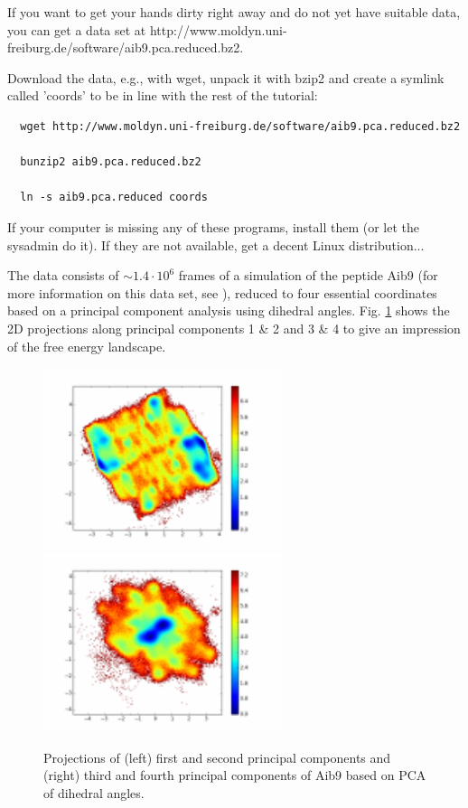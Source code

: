 \documentclass[12pt,a4paper,twoside,english,fleqn]{article}
\begin{document}
\begin{mdframed}[frametitle={Test data available!}]
  If you want to get your hands dirty right away and do not yet have suitable
  data, you can get a data set at
  http://www.moldyn.uni-freiburg.de/software/aib9.pca.reduced.bz2.

  Download the data, e.g., with {\ttfamily wget}, unpack it with
  {\ttfamily bzip2} and create a symlink called 'coords' to be in line with
  the rest of the tutorial:
  \begin{lstlisting}
  wget http://www.moldyn.uni-freiburg.de/software/aib9.pca.reduced.bz2

  bunzip2 aib9.pca.reduced.bz2

  ln -s aib9.pca.reduced coords
  \end{lstlisting}

  If your computer is missing any of these programs, install them (or let the
  sysadmin do it). If they are not available, get a decent Linux distribution...

  The data consists of $\sim 1.4 \cdot 10^6$ frames of a simulation of the
  peptide Aib9 (for more information on this data set, see \cite{Buchenberg15}),
  reduced to four essential coordinates based on a principal
  component analysis using dihedral angles.
  Fig. \ref{fig:pca_proj} shows the 2D projections along principal components
  1 \& 2 and 3 \& 4 to give an impression of the free energy landscape.
\end{mdframed}

\begin{figure}
  \centerline{
    \includegraphics[width=7cm] {aib9_pca_pc1_pc2}
    \hspace{1cm}
    \includegraphics[width=7cm] {aib9_pca_pc3_pc4}}
  \caption{\label{fig:pca_proj}
    Projections of (left) first and second principal components
    and (right) third and fourth principal components of
    Aib9 based on PCA of dihedral angles.}
\end{figure}
\end{document}
